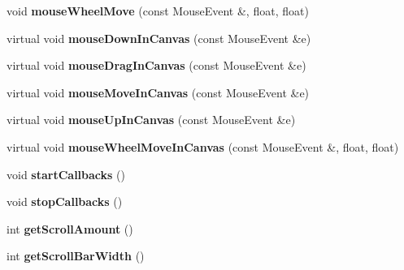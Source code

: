 \begin{DoxyCompactItemize}
\item 
\hypertarget{classOpenGLCanvas_a8410ec43c862c02fe919eb865aeae0e2}{void {\bfseries mouse\-Wheel\-Move} (const Mouse\-Event \&, float, float)}\label{classOpenGLCanvas_a8410ec43c862c02fe919eb865aeae0e2}

\item 
\hypertarget{classOpenGLCanvas_aee6d5b6ad361deb3ee1b13dbe7715532}{virtual void {\bfseries mouse\-Down\-In\-Canvas} (const Mouse\-Event \&e)}\label{classOpenGLCanvas_aee6d5b6ad361deb3ee1b13dbe7715532}

\item 
\hypertarget{classOpenGLCanvas_a5068fe5a0f604c861f398aab4c319a8d}{virtual void {\bfseries mouse\-Drag\-In\-Canvas} (const Mouse\-Event \&e)}\label{classOpenGLCanvas_a5068fe5a0f604c861f398aab4c319a8d}

\item 
\hypertarget{classOpenGLCanvas_a2f734d31278c4f4443bd2b039bc1a565}{virtual void {\bfseries mouse\-Move\-In\-Canvas} (const Mouse\-Event \&e)}\label{classOpenGLCanvas_a2f734d31278c4f4443bd2b039bc1a565}

\item 
\hypertarget{classOpenGLCanvas_ad39cc41b017720832f7e426e43e54082}{virtual void {\bfseries mouse\-Up\-In\-Canvas} (const Mouse\-Event \&e)}\label{classOpenGLCanvas_ad39cc41b017720832f7e426e43e54082}

\item 
\hypertarget{classOpenGLCanvas_abbf0f5d0407286e3d218efe97a818289}{virtual void {\bfseries mouse\-Wheel\-Move\-In\-Canvas} (const Mouse\-Event \&, float, float)}\label{classOpenGLCanvas_abbf0f5d0407286e3d218efe97a818289}

\item 
\hypertarget{classOpenGLCanvas_aec665b76f2b0578853482762efbd9712}{void {\bfseries start\-Callbacks} ()}\label{classOpenGLCanvas_aec665b76f2b0578853482762efbd9712}

\item 
\hypertarget{classOpenGLCanvas_a8566b4cd2548284e62127d456b76ef46}{void {\bfseries stop\-Callbacks} ()}\label{classOpenGLCanvas_a8566b4cd2548284e62127d456b76ef46}

\item 
\hypertarget{classOpenGLCanvas_a37391e2d630954b0bf1c4d668fc6fca2}{int {\bfseries get\-Scroll\-Amount} ()}\label{classOpenGLCanvas_a37391e2d630954b0bf1c4d668fc6fca2}

\item 
\hypertarget{classOpenGLCanvas_ae8977529a53d1684048e7544cd10f7cd}{int {\bfseries get\-Scroll\-Bar\-Width} ()}\label{classOpenGLCanvas_ae8977529a53d1684048e7544cd10f7cd}


\end{DoxyCompactItemize}
